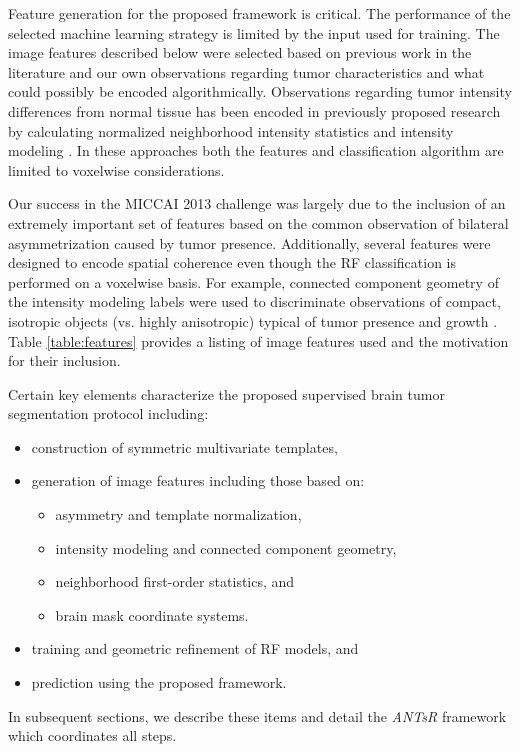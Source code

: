 Feature generation for the proposed framework is critical.  The performance
of the selected machine learning strategy is limited by the input used for 
training. The image features described below were selected based on previous
work in the literature and our own observations regarding tumor characteristics
and what could possibly be encoded algorithmically.  Observations 
regarding tumor intensity differences from normal tissue has been encoded
in previously proposed research by calculating normalized neighborhood 
intensity statistics and intensity modeling \citep[e.g.,][]{bauer2011,bauer2012,geremia2012,zikic2012}.
In these approaches both the features and classification algorithm are limited to 
voxelwise considerations.  

Our success in the MICCAI 2013 challenge was largely due to the inclusion of
an extremely important set of features based on the common observation of
bilateral asymmetrization caused by tumor presence.  Additionally, several
features were designed to encode spatial coherence even though the RF classification
is performed on a voxelwise basis. For example, connected component geometry of the
intensity modeling labels were used to discriminate observations of compact,
isotropic objects (vs. highly anisotropic) typical of tumor presence and growth 
\citep{greenspan1972}.  Table \ref{table:features} provides a listing of image
features used and the motivation for their inclusion.  

Certain key elements characterize the proposed supervised brain tumor segmentation
protocol including:
\begin{itemize}
  \item construction of symmetric multivariate templates,
  \item generation of image features including those based on:
    \begin{itemize}
      \item asymmetry and template normalization, 
      \item intensity modeling and connected component geometry,      
      \item neighborhood first-order statistics, and
      \item brain mask coordinate systems.
    \end{itemize}
  \item training and geometric refinement of RF models, and
  \item prediction using the proposed framework.
\end{itemize}
In subsequent sections, we describe these items and detail the
\textit{ANTsR} framework which coordinates all steps.

